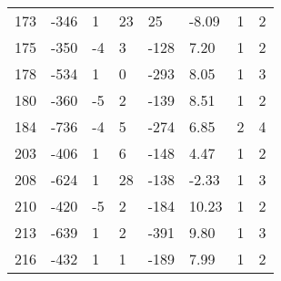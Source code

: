 \begin{appendices}
\begin{longtable}[c]{@{}llllllll@{}}
	173                      & -346                          & 1                            & 23                           & 25                       & -8.09                   & 1                    & 2                       \\
	175                      & -350                          & -4                           & 3                            & -128                     & 7.20                    & 1                    & 2                       \\
	178                      & -534                          & 1                            & 0                            & -293                     & 8.05                    & 1                    & 3                       \\
	180                      & -360                          & -5                           & 2                            & -139                     & 8.51                    & 1                    & 2                       \\
	184                      & -736                          & -4                           & 5                            & -274                     & 6.85                    & 2                    & 4                       \\
	203                      & -406                          & 1                            & 6                            & -148                     & 4.47                    & 1                    & 2                       \\
	208                      & -624                          & 1                            & 28                           & -138                     & -2.33                   & 1                    & 3                       \\
	210                      & -420                          & -5                           & 2                            & -184                     & 10.23                   & 1                    & 2                       \\
	213                      & -639                          & 1                            & 2                            & -391                     & 9.80                    & 1                    & 3                       \\
	216                      & -432                          & 1                            & 1                            & -189                     & 7.99                    & 1                    & 2                       \\

\end{longtable}
\end{appendices}
